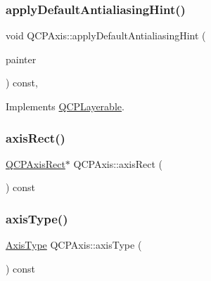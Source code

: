 \subsubsection{\texorpdfstring{applyDefaultAntialiasingHint()}{applyDefaultAntialiasingHint()}}
{\footnotesize\ttfamily void Q\+C\+P\+Axis\+::apply\+Default\+Antialiasing\+Hint (\begin{DoxyParamCaption}\item[{\mbox{\hyperlink{class_q_c_p_painter}{Q\+C\+P\+Painter}} $\ast$}]{painter }\end{DoxyParamCaption}) const\hspace{0.3cm}{\ttfamily [protected]}, {\ttfamily [virtual]}}



Implements \mbox{\hyperlink{class_q_c_p_layerable_afdf83ddc6a265cbf4c89fe99d3d93473}{Q\+C\+P\+Layerable}}.

\mbox{\label{class_q_c_p_axis_afc94bcfdf8adfe8e01013f13bdf159a2}} 
\subsubsection{\texorpdfstring{axisRect()}{axisRect()}}
{\footnotesize\ttfamily \mbox{\hyperlink{class_q_c_p_axis_rect}{Q\+C\+P\+Axis\+Rect}}$\ast$ Q\+C\+P\+Axis\+::axis\+Rect (\begin{DoxyParamCaption}{ }\end{DoxyParamCaption}) const\hspace{0.3cm}{\ttfamily [inline]}}

\mbox{\label{class_q_c_p_axis_aa19679359783c5ecd27757b7e5619976}} 
\subsubsection{\texorpdfstring{axisType()}{axisType()}}
{\footnotesize\ttfamily \mbox{\hyperlink{class_q_c_p_axis_ae2bcc1728b382f10f064612b368bc18a}{Axis\+Type}} Q\+C\+P\+Axis\+::axis\+Type (\begin{DoxyParamCaption}{ }\end{DoxyParamCaption}) const\hspace{0.3cm}{\ttfamily [inline]}}

\mbox{\label{class_q_c_p_axis_a216974be018e73008b3cf6d033c1325d}} 

